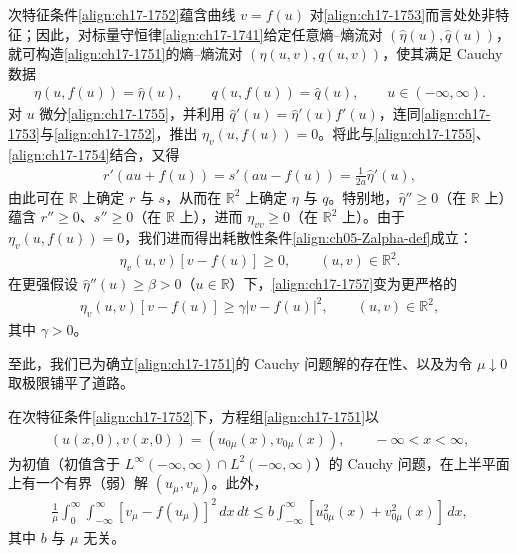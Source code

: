 \documentclass[../../main.tex]{subfiles}
\begin{document}
次特征条件\eqref{align:ch17-1752}蕴含曲线 $v=f(u)$ 对\eqref{align:ch17-1753}而言处处非特征；因此，对标量守恒律\eqref{align:ch17-1741}给定任意熵--熵流对 $(\hat\eta(u),\hat q(u))$，就可构造\eqref{align:ch17-1751}的熵--熵流对 $(\eta(u,v),q(u,v))$，使其满足 Cauchy 数据
\begin{align}
\eta(u,f(u))=\hat\eta(u),\qquad q(u,f(u))=\hat q(u),\qquad u\in(-\infty,\infty).
\label{align:ch17-1755}
\end{align}
对 $u$ 微分\eqref{align:ch17-1755}，并利用 $\hat q'(u)=\hat\eta'(u)f'(u)$，连同\eqref{align:ch17-1753}与\eqref{align:ch17-1752}，推出 $\eta_v(u,f(u))=0$。将此与\eqref{align:ch17-1755}、\eqref{align:ch17-1754}结合，又得
\begin{align}
r'(au+f(u))=s'(au-f(u))=\frac{1}{2a}\hat\eta'(u),
\label{align:ch17-1756}
\end{align}
由此可在 $\mathbb{R}$ 上确定 $r$ 与 $s$，从而在 $\mathbb{R}^2$ 上确定 $\eta$ 与 $q$。特别地，$\hat\eta''\geqslant0$（在 $\mathbb{R}$ 上）蕴含 $r''\geqslant0$、$s''\geqslant0$（在 $\mathbb{R}$ 上），进而 $\eta_{vv}\geqslant0$（在 $\mathbb{R}^2$ 上）。由于 $\eta_v(u,f(u))=0$，我们进而得出耗散性条件\eqref{align:ch05-Zalpha-def}成立：
\begin{align}
\eta_v(u,v)[v-f(u)]\geqslant0,\qquad(u,v)\in\mathbb{R}^2.
\label{align:ch17-1757}
\end{align}
在更强假设 $\hat\eta''(u)\geqslant\beta>0$（$u\in\mathbb{R}$）下，\eqref{align:ch17-1757}变为更严格的
\begin{align}
\eta_v(u,v)[v-f(u)]\geqslant\gamma|v-f(u)|^2,\qquad(u,v)\in\mathbb{R}^2,
\label{align:ch17-1758}
\end{align}
其中 $\gamma>0$。

至此，我们已为确立\eqref{align:ch17-1751}的 Cauchy 问题解的存在性、以及为令 $\mu\downarrow0$ 取极限铺平了道路。

\begin{theorem}[松弛格式的整体存在性]\label{theorem:ch17-松弛存在性}
在次特征条件\eqref{align:ch17-1752}下，方程组\eqref{align:ch17-1751}以
\begin{align}
(u(x,0),v(x,0))=(u_{0\mu}(x),v_{0\mu}(x)),\qquad-\infty<x<\infty,
\label{align:ch17-1759}
\end{align}
为初值（初值含于 $L^\infty(-\infty,\infty)\cap L^2(-\infty,\infty)$）的 Cauchy 问题，在上半平面上有一个有界（弱）解 $(u_\mu,v_\mu)$。此外，
\begin{align}
\frac{1}{\mu}\int_0^\infty\int_{-\infty}^\infty[v_\mu-f(u_\mu)]^2\,dx\,dt\leqslant b\int_{-\infty}^\infty[u_{0\mu}^2(x)+v_{0\mu}^2(x)]\,dx,
\label{align:ch17-17510}
\end{align}
其中 $b$ 与 $\mu$ 无关。
\end{theorem}
\end{document}
